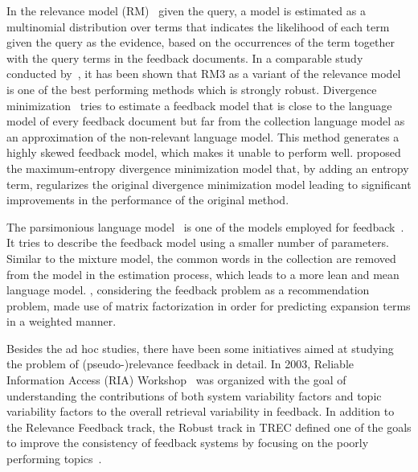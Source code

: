 In the relevance model (RM)~\citep{Abdul-jaleel:2004,Lavrenko:2001} given the query, a model is estimated as a multinomial distribution over terms that indicates the likelihood of each term given the query as the evidence, based on the occurrences of the term together with the query terms in the feedback documents.  In a comparable study conducted by~\citet{Zhai:SMM:2001}, it has been shown that RM3 as a variant of the relevance model is one of the best performing methods which is strongly robust.
Divergence minimization~\citep{Zhai:SMM:2001} tries to estimate a feedback model that is close to the language model of every feedback document but far from the collection language model as an approximation of the non-relevant language model. This method generates a highly skewed feedback model, which makes it unable to perform well. \citet{Lv:2014} proposed the maximum-entropy divergence minimization model that, by adding an entropy term, regularizes the original divergence minimization model leading to significant improvements in the performance of the original method.

The parsimonious language model~\citep{Hiemstra:2004} is one of the models employed for feedback~\citep{Meij:2008,Hiemstra:2008:TREC,Kaptein:2008:TREC}. It tries to describe the feedback model using a smaller number of parameters. Similar to the mixture model, the common words in the collection are removed from the model in the estimation process, which leads to a more lean and mean language model.  \citet{Zamani:2016a}, considering the feedback problem as a recommendation problem, made use of matrix factorization in order for predicting expansion terms in a weighted manner.

Besides the ad hoc studies, there have been some initiatives aimed at studying the problem of (pseudo-)relevance feedback in detail. In 2003, Reliable Information Access (RIA) Workshop~\citep{Harman:2009,Warren:2004} 
was organized with the goal of understanding the contributions of both system variability factors and topic variability factors to the overall retrieval variability in feedback. 
In addition to the Relevance Feedback track, the Robust track in TREC defined one of the goals to improve the consistency of feedback systems by focusing on the poorly performing topics~\citep{Voorhees:2003:TREC}.

